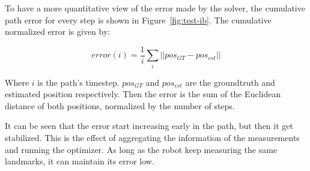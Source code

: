To have a more quantitative view of the error made by the solver, the cumulative path error for every step is shown in Figure~\ref{fig:test-ib}.  The cumulative normalized error is given by:

\begin{equation}
error (i) = \frac{1}{i} \sum_{i} ||pos_{GT}-pos_{est}||
\end{equation} 

Where $i$ is the path's timestep. $pos_{GT}$ and $pos_{est}$ are the groundtruth and estimated position respectively. Then the error is the sum of the Euclidean distance of both positions, normalized by the number of steps. 

It can be seen that the error start increasing early in the path, but then it get stabilized. This is the effect of aggregating the information of the measurements and running the optimizer. As long as the robot keep measuring the same landmarks, it can maintain its error low. 



